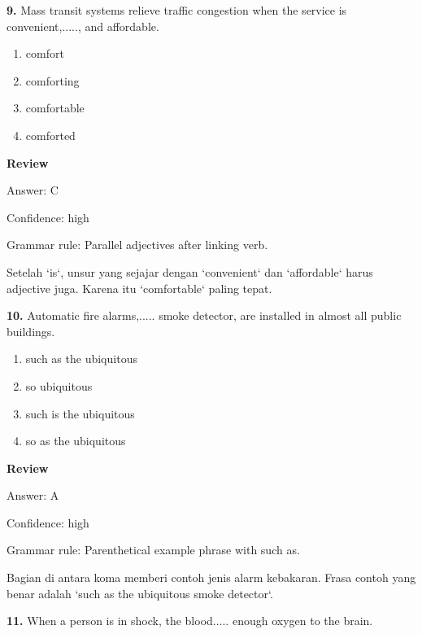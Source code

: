 \documentclass[12pt]{article}
\begin{document}
\endgroup
\par
\vspace{0.25\baselineskip}
\noindent\textbf{9.} Mass transit systems relieve traffic congestion when the service is convenient,....., and affordable.
\begin{enumerate}[label=(\Alph*),leftmargin=*,itemsep=0.2em]
\item comfort
\item comforting
\item comfortable
\item comforted
\end{enumerate}
\par
\begingroup
\setlength{\parskip}{0pt}
\setlength{\parindent}{0pt}
\textbf{Review}\par
Answer: C\par
Confidence: high\par
Grammar rule: Parallel adjectives after linking verb.\par
Setelah `is`, unsur yang sejajar dengan `convenient` dan `affordable` harus adjective juga. Karena itu `comfortable` paling tepat.\par
\endgroup
\par
\vspace{0.25\baselineskip}
\noindent\textbf{10.} Automatic fire alarms,..... smoke detector, are installed in almost all public buildings.
\begin{enumerate}[label=(\Alph*),leftmargin=*,itemsep=0.2em]
\item such as the ubiquitous
\item so ubiquitous
\item such is the ubiquitous
\item so as the ubiquitous
\end{enumerate}
\par
\begingroup
\setlength{\parskip}{0pt}
\setlength{\parindent}{0pt}
\textbf{Review}\par
Answer: A\par
Confidence: high\par
Grammar rule: Parenthetical example phrase with such as.\par
Bagian di antara koma memberi contoh jenis alarm kebakaran. Frasa contoh yang benar adalah `such as the ubiquitous smoke detector`.\par
\endgroup
\par
\vspace{0.25\baselineskip}
\noindent\textbf{11.} When a person is in shock, the blood..... enough oxygen to the brain.
\end{document}
